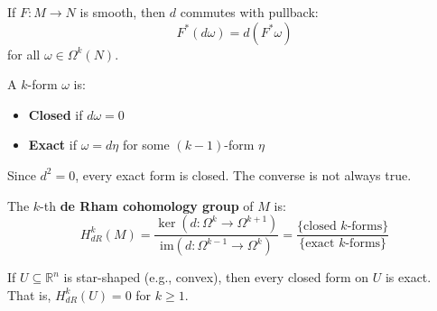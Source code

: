 \begin{theorem}[Naturality of $d$]
    If $F: M \to N$ is smooth, then $d$ commutes with pullback:
    \[
        F^*(d\omega) = d(F^*\omega)
    \]
    for all $\omega \in \Omega^k(N)$.
\end{theorem}

\begin{definition}
    A $k$-form $\omega$ is:
    \begin{itemize}
        \item \textbf{Closed} if $d\omega = 0$
        \item \textbf{Exact} if $\omega = d\eta$ for some $(k-1)$-form $\eta$
    \end{itemize}
    Since $d^2 = 0$, every exact form is closed. The converse is not always true.
\end{definition}

\begin{center}
\end{center}

\begin{definition}
    The $k$-th \textbf{de Rham cohomology group} of $M$ is:
    \[
        H^k_{dR}(M) = \frac{\ker(d: \Omega^k \to \Omega^{k+1})}{\mathrm{im}(d: \Omega^{k-1} \to \Omega^k)} = \frac{\{\text{closed } k\text{-forms}\}}{\{\text{exact } k\text{-forms}\}}
    \]
\end{definition}

\begin{theorem}
    If $U \subseteq \mathbb{R}^n$ is star-shaped (e.g., convex), then every closed form on $U$ is exact. That is, $H^k_{dR}(U) = 0$ for $k \geq 1$.
\end{theorem}

